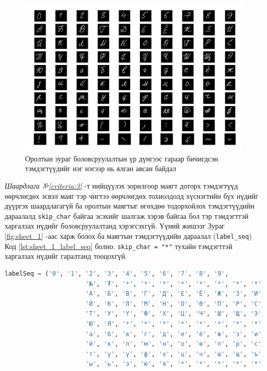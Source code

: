 \begin{figure}[H]
	\centering
	\includegraphics[width=1\linewidth]{images/sheet_final_segmented}
	\caption{Оролтын зураг боловсруулалтын үр дүнгээс гараар бичигдсэн тэмдэгтүүдийг нэг нэгээр нь ялган авсан байдал}
	\label{fig:sheet_final_segmented}
\end{figure}

\textit{Шаардлага №\ref{criteria:3}} -т нийцүүлэх зорилгоор маягт доторх тэмдэгтүүд өөрчлөгдөх эсвэл маяг тэр чигтээ өөрчлөгдөх тохиолдолд хүснэгтийн бүх нүдийг дүүргэх шаардлагагүй ба оролтын маягтыг өгөхдөө тодорхойлох тэмдэгтүүдийн дараалалд \texttt{skip\_char} байгаа эсэхийг шалгаж хэрэв байгаа бол тэр тэмдэгттэй харгалзах нүдийг боловсруулалтанд хэрэгсэхгүй. Үүний жишээг Зураг \ref{fig:sheet_1} -аас харж болох ба маягтын тэмдэгтүүдийн дараалал (\texttt{label\_seq}) Код \ref{lst:sheet_1_label_seq} болно. \texttt{skip\_char = "*"} тухайн тэмдэгттэй харгалзах нүдийг гаралтанд тооцохгүй.

\begin{lstlisting}[caption={Хамгийн эхний маягтын хувилбарын нүднүүд, тэдгээрт харгалзах тэмдэгтүүдийн дараалал}, label={lst:sheet_1_label_seq}, language=Python]
labelSeq = ('0', '1', '2', '3', '4', '5', '6', '7', '8', '9', 
					  '№', '₮', '*', '*', '*', '*', '*', '*', '*', '*', 
					  'А', 'Б', 'В', 'Г', 'Д', 'Е', 'Ё', 'Ж', 'З', 'И', 
					  'Й', 'К', 'Л', 'М', 'Н', 'О', 'Ө', 'П', 'Р', 'С', 
					  'Т', 'У', 'Ү', 'Ф', 'Х', 'Ц', 'Ч', 'Ш', 'Щ', 'Э', 
					  'Ю', 'Я', '*', '*', '*', '*', '*', '*', '*', '*', 
					  'а', 'б', 'в', 'г', 'д', 'е', 'ё', 'ж', 'з', 'и', 
					  'й', 'к', 'л', 'м', 'н', 'о', 'ө', 'п', 'р', 'с',
					  'т', 'у', 'ү', 'ф', 'х', 'ц', 'ч', 'ш', 'щ', 'ъ', 
					  'ы', 'ь', 'э', 'ю', 'я', '*', '*', '*', '*', '*')
\end{lstlisting}

